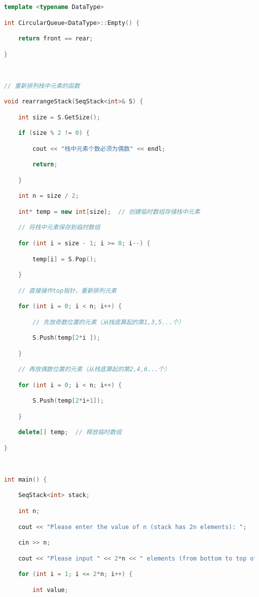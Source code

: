 \begin{lstlisting}[language=C++]
template <typename DataType>

int CircularQueue<DataType>::Empty() {

    return front == rear;

}

  

// 重新排列栈中元素的函数

void rearrangeStack(SeqStack<int>& S) {

    int size = S.GetSize();

    if (size % 2 != 0) {

        cout << "栈中元素个数必须为偶数" << endl;

        return;

    }

    int n = size / 2;

    int* temp = new int[size];  // 创建临时数组存储栈中元素

    // 将栈中元素保存到临时数组

    for (int i = size - 1; i >= 0; i--) {

        temp[i] = S.Pop();

    }

    // 直接操作top指针，重新排列元素

    for (int i = 0; i < n; i++) {

        // 先放奇数位置的元素（从栈底算起的第1,3,5...个）

        S.Push(temp[2*i ]);

    }

    // 再放偶数位置的元素（从栈底算起的第2,4,6...个）

    for (int i = 0; i < n; i++) {

        S.Push(temp[2*i+1]);

    }

    delete[] temp;  // 释放临时数组

}

  

int main() {

    SeqStack<int> stack;

    int n;

    cout << "Please enter the value of n (stack has 2n elements): ";

    cin >> n;

    cout << "Please input " << 2*n << " elements (from bottom to top of stack):" << endl;

    for (int i = 1; i <= 2*n; i++) {

        int value;


\end{lstlisting}
